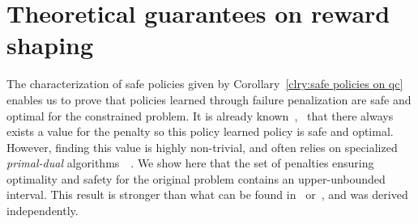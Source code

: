 \section{Theoretical guarantees on reward shaping} \label{sec:strong duality}
The characterization of safe policies given by Corollary~\ref{clry:safe policies on qc} enables us to prove that policies learned through failure penalization are safe and optimal for the constrained problem. It is already known~\cite{altman1999constrained},~\cite{paternain2019safe} that there always exists a value for the penalty so this policy learned policy is safe and optimal. However, finding this value is highly non-trivial, and often relies on specialized\emph{ primal-dual} algorithms~\cite{chow2017risk}~\cite{paternain2019safe}. We show here that the set of penalties ensuring optimality and safety for the original problem contains an upper-unbounded interval. This result is stronger than what can be found in~\cite{altman1999constrained} or~\cite{paternain2019safe}, and was derived independently.

